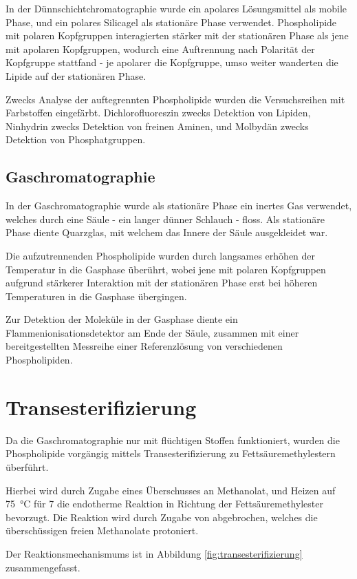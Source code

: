 \documentclass[a4paper,english]{scrreprt}
\begin{document}
In der Dünnschichtchromatographie wurde ein apolares Lösungsmittel als mobile
Phase, und ein polares Silicagel als stationäre Phase verwendet. Phospholipide
mit polaren Kopfgruppen interagierten stärker mit der stationären Phase als
jene mit apolaren Kopfgruppen, wodurch eine Auftrennung nach Polarität der
Kopfgruppe stattfand - je apolarer die Kopfgruppe, umso weiter wanderten die
Lipide auf der stationären Phase.

Zwecks Analyse der auftegrennten Phospholipide wurden die Versuchsreihen mit
Farbstoffen eingefärbt. Dichlorofluoreszin zwecks Detektion von Lipiden,
Ninhydrin zwecks Detektion von freinen Aminen, und Molbydän zwecks Detektion
von Phosphatgruppen.

\subsection{Gaschromatographie}

In der Gaschromatographie wurde als stationäre Phase ein inertes Gas verwendet,
welches durch eine Säule - ein langer dünner Schlauch - floss. Als stationäre
Phase diente Quarzglas, mit welchem das Innere der Säule ausgekleidet war.

Die aufzutrennenden Phospholipide wurden durch langsames erhöhen der Temperatur
in die Gasphase überührt, wobei jene mit polaren Kopfgruppen aufgrund stärkerer
Interaktion mit der stationären Phase erst bei höheren Temperaturen in die
Gasphase übergingen.

Zur Detektion der Moleküle in der Gasphase diente ein
Flammenionisationsdetektor am Ende der Säule, zusammen mit einer
bereitgestellten Messreihe einer Referenzlösung von verschiedenen
Phospholipiden.

\section{Transesterifizierung}

Da die Gaschromatographie nur mit flüchtigen Stoffen funktioniert, wurden die
Phospholipide vorgängig mittels Transesterifizierung zu Fettsäuremethylestern
überführt. \cite{handoutv11}

Hierbei wird durch Zugabe eines Überschusses an Methanolat, und Heizen auf
\SI{75}{\celsius} für \SI{7}{\min} die endotherme Reaktion in Richtung der
Fettsäuremethylester bevorzugt. Die Reaktion wird durch Zugabe von 
abgebrochen, welches die überschüssigen freien Methanolate protoniert.

Der Reaktionsmechanismums ist in Abbildung \ref{fig:transesterifizierung}
zusammengefasst.
\end{document}
